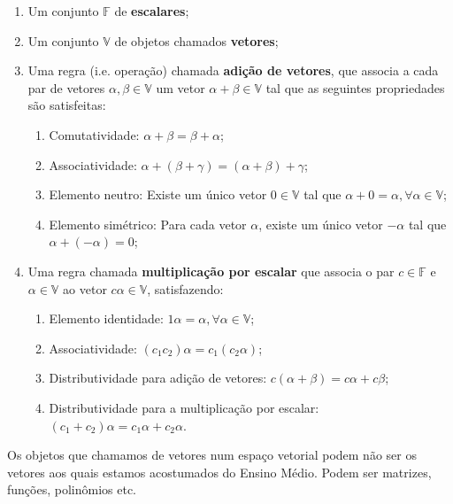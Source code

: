 \documentclass[
]{article}
\begin{document}
\begin{enumerate}
\def\labelenumi{\arabic{enumi}.}
\item
  Um conjunto \(\mathbb{F}\) de \textbf{escalares};
\item
  Um conjunto \(\mathbb{V}\) de objetos chamados \textbf{vetores};
\item
  Uma regra (i.e. operação) chamada \textbf{adição de vetores}, que
  associa a cada par de vetores \(\alpha , \beta \in \mathbb{V}\) um
  vetor \(\alpha + \beta \in \mathbb{V}\) tal que as seguintes
  propriedades são satisfeitas:

  \begin{enumerate}
  \def\labelenumii{\arabic{enumii}.}
  \item
    Comutatividade: \(\alpha + \beta = \beta + \alpha\);
  \item
    Associatividade:
    \(\alpha + (\beta + \gamma) = (\alpha + \beta) + \gamma\);
  \item
    Elemento neutro: Existe um único vetor \(0 \in \mathbb{V}\) tal que
    \(\alpha + 0 = \alpha, \forall \alpha \in \mathbb{V}\);
  \item
    Elemento simétrico: Para cada vetor \(\alpha\), existe um único
    vetor \(-\alpha\) tal que \(\alpha + (- \alpha) = 0\);
  \end{enumerate}
\item
  Uma regra chamada \textbf{multiplicação por escalar} que associa o par
  \(c \in \mathbb{F}\) e \(\alpha \in \mathbb{V}\) ao vetor
  \(c \alpha \in \mathbb{V}\), satisfazendo:

  \begin{enumerate}
  \def\labelenumii{\arabic{enumii}.}
  \item
    Elemento identidade:
    \(1 \alpha = \alpha, \forall \alpha \in \mathbb{V}\);
  \item
    Associatividade: \((c_1 c_2)\alpha = c_1(c_2 \alpha)\);
  \item
    Distributividade para adição de vetores:
    \(c(\alpha + \beta) = c\alpha + c\beta\);
  \item
    Distributividade para a multiplicação por escalar:
    \((c_1 + c_2) \alpha = c_1 \alpha + c_2 \alpha\).
  \end{enumerate}
\end{enumerate}

Os objetos que chamamos de vetores num espaço vetorial podem não ser os
vetores aos quais estamos acostumados do Ensino Médio. Podem ser
matrizes, funções, polinômios etc.
\end{document}
